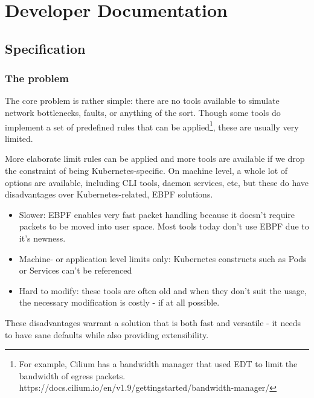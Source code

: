 \chapter{Developer Documentation} %
\label{ch:impl}

\section{Specification}
\subsection{The problem}
The core problem is rather simple: there are no tools available to simulate network bottlenecks, faults, or anything of the sort. Though some tools do implement a set of predefined rules that can be applied\footnote{For example, Cilium has a bandwidth manager that used EDT to limit the bandwidth of egress packets. https://docs.cilium.io/en/v1.9/gettingstarted/bandwidth-manager/}, these are usually very limited.

More elaborate limit rules can be applied and more tools are available if we drop the constraint of being Kubernetes-specific. On machine level, a whole lot of options are available, including CLI tools, daemon services, etc, but these do have disadvantages over Kubernetes-related, EBPF solutions.
\begin{itemize}
	\item Slower: EBPF enables very fast packet handling because it doesn't require packets to be moved into user space. Most tools today don't use EBPF due to it's newness. 
	\item Machine- or application level limits only: Kubernetes constructs such as Pods or Services can't be referenced
	\item Hard to modify: these tools are often old and when they don't suit the usage, the necessary modification is costly - if at all possible. \newline
\end{itemize}

These disadvantages warrant a solution that is both fast and versatile - it needs to have sane defaults while also providing extensibility.

